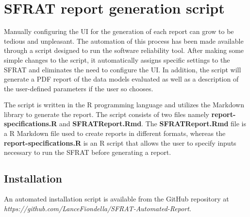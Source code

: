 \documentclass[conference]{IEEEtran}
\begin{document}
\section{SFRAT report generation script}\label{sec:Script}

Manually configuring the UI for the generation of each report can grow to be tedious and unpleasant. The automation of this process has been made available through a script designed to run the software reliability tool. After making some simple changes to the script, it automatically assigns specific settings to the SFRAT and eliminates the need to configure the UI. In addition, the script will generate a PDF report of the data models evaluated as well as a description of the user-defined parameters if the user so chooses.

The script is written in the R programming language and utilizes the Markdown library to generate the report. The script consists of two files namely \textbf{report-specifications.R} and \textbf{SFRATReport.Rmd}. The \textbf{SFRATReport.Rmd} file is a R Markdown file used to create reports in different formats, whereas the \textbf{report-specifications.R} is an R script that allows the user to specify inputs necessary to run the SFRAT before generating a report.

\subsection{Installation}\label{sec:ScriptInstall}
An automated installation script is available from the GitHub repository at \textit{https://github.com/LanceFiondella/SFRAT-Automated-Report}.
\end{document}
